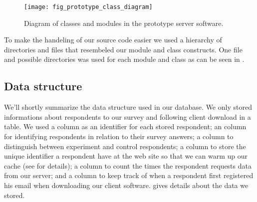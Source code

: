 \begin{figure}
  \begin{whole}
    \texttt{[image: fig\_prototype\_class\_diagram]}
    \caption[Prototype Class Diagram]{
      Diagram of classes and modules in the prototype server software.
    }
    \label{figure:fig.prototype.class.diagram}
  \end{whole}
\end{figure}

To make the handeling of our source code easier we used a hierarchy of
directories and files that resembeled our module and class constructs. One
file and possible directories was used for each module and class
as can be seen in .

\subsection{Data structure}

We'll shortly summarize the data structure used in our database. We
only stored informations about respondents to our survey and following
client download in a  table. We used a  column as
an identifier for each stored respondent; an  column for
identifying respondents in relation to their survey answers; a 
column to distinguish between experiment and control respondents; a
 column to store the unique identifier a respondent have at
the \urort{} web site so that we can warm up our cache (see
 for details);
a  column to count the times the respondent requests data from
our server; and a  column to keep track of when a respondent
first registered his email when downloading our client software.
gives details about the data we stored.


